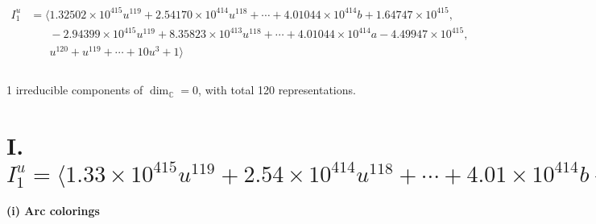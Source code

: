\documentclass[1p]{elsarticle_modified}
\theoremstyle{definition}
\begin{document}
\begin{align*}
I^u_{1}&=\langle 
1.32502\times10^{415} u^{119}+2.54170\times10^{414} u^{118}+\cdots+4.01044\times10^{414} b+1.64747\times10^{415},\\
\phantom{I^u_{1}}&\phantom{= \langle  }-2.94399\times10^{415} u^{119}+8.35823\times10^{413} u^{118}+\cdots+4.01044\times10^{414} a-4.49947\times10^{415},\\
\phantom{I^u_{1}}&\phantom{= \langle  }u^{120}+u^{119}+\cdots+10 u^3+1\rangle \\
\\
\end{align*}
\raggedright * 1 irreducible components of $\dim_{\mathbb{C}}=0$, with total 120 representations.\\
\newpage
\renewcommand{\arraystretch}{1}
\centering \section*{I. $I^u_{1}= \langle 1.33\times10^{415} u^{119}+2.54\times10^{414} u^{118}+\cdots+4.01\times10^{414} b+1.65\times10^{415},\;-2.94\times10^{415} u^{119}+8.36\times10^{413} u^{118}+\cdots+4.01\times10^{414} a-4.50\times10^{415},\;u^{120}+u^{119}+\cdots+10 u^3+1 \rangle$}
\flushleft \textbf{(i) Arc colorings}\\
\end{document}
